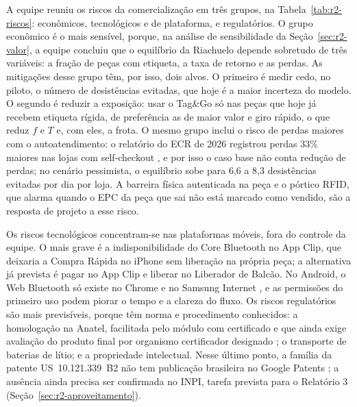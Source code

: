 A equipe reuniu os riscos da comercialização em três grupos, na Tabela~\ref{tab:r2-riscos}: econômicos, tecnológicos e de plataforma, e regulatórios. O grupo econômico é o mais sensível, porque, na análise de sensibilidade da Seção~\ref{sec:r2-valor}, a equipe concluiu que o equilíbrio da Riachuelo depende sobretudo de três variáveis: a fração de peças com etiqueta, a taxa de retorno e as perdas. As mitigações desse grupo têm, por isso, dois alvos. O primeiro é medir cedo, no piloto, o número de desistências evitadas, que hoje é a maior incerteza do modelo. O segundo é reduzir a exposição: usar o Tag\&Go só nas peças que hoje já recebem etiqueta rígida, de preferência as de maior valor e giro rápido, o que reduz $f$ e $T$ e, com eles, a frota. O mesmo grupo inclui o risco de perdas maiores com o autoatendimento: o relatório do ECR de 2026 registrou perdas 33\% maiores nas lojas com self-checkout \cite{ecr2026selfcheckout}, e por isso o caso base não conta redução de perdas; no cenário pessimista, o equilíbrio sobe para 6,6 a 8,3 desistências evitadas por dia por loja. A barreira física autenticada na peça e o pórtico RFID, que alarma quando o EPC da peça que sai não está marcado como vendido, são a resposta de projeto a esse risco.

Os riscos tecnológicos concentram-se nas plataformas móveis, fora do controle da equipe. O mais grave é a indisponibilidade do Core Bluetooth no App Clip, que deixaria a Compra Rápida no iPhone sem liberação na própria peça; a alternativa já prevista é pagar no App Clip e liberar no Liberador de Balcão. No Android, o Web Bluetooth só existe no Chrome e no Samsung Internet \cite{chrome2026webbluetooth}, e as permissões do primeiro uso podem piorar o tempo e a clareza do fluxo. Os riscos regulatórios são mais previsíveis, porque têm norma e procedimento conhecidos: a homologação na Anatel, facilitada pelo módulo com certificado \cite{espressif2026certificados} e que ainda exige avaliação do produto final por organismo certificador designado \cite{anatel2019res715}; o transporte de baterias de lítio; e a propriedade intelectual. Nesse último ponto, a família da patente US~10.121.339~B2 não tem publicação brasileira no Google Patents \cite{googlepatents2018us10121339}; a ausência ainda precisa ser confirmada no INPI, tarefa prevista para o Relatório 3 (Seção~\ref{sec:r2-aproveitamento}).

